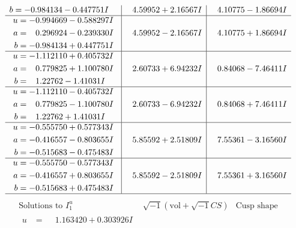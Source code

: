 \documentclass[1p]{elsarticle_modified}
\theoremstyle{definition}
\newcommand{\I}{\sqrt{-1}}
\begin{document}
$$\begin{array}{c|c|c}
\begin{aligned}
b &= -0.984134 - 0.447751 I\end{aligned}
 & \phantom{-}4.59952 + 2.16567 I & \phantom{-}4.10775 - 1.86694 I \\ \hline\begin{aligned}
u &= -0.994669 - 0.588297 I \\
a &= \phantom{-}0.296924 - 0.239330 I \\
b &= -0.984134 + 0.447751 I\end{aligned}
 & \phantom{-}4.59952 - 2.16567 I & \phantom{-}4.10775 + 1.86694 I \\ \hline\begin{aligned}
u &= -1.112110 + 0.405732 I \\
a &= \phantom{-}0.779825 + 1.100780 I \\
b &= \phantom{-}1.22762 - 1.41031 I\end{aligned}
 & \phantom{-}2.60733 + 6.94232 I & \phantom{-}0.84068 - 7.46411 I \\ \hline\begin{aligned}
u &= -1.112110 - 0.405732 I \\
a &= \phantom{-}0.779825 - 1.100780 I \\
b &= \phantom{-}1.22762 + 1.41031 I\end{aligned}
 & \phantom{-}2.60733 - 6.94232 I & \phantom{-}0.84068 + 7.46411 I \\ \hline\begin{aligned}
u &= -0.555750 + 0.577343 I \\
a &= -0.416557 - 0.803655 I \\
b &= -0.515683 - 0.475483 I\end{aligned}
 & \phantom{-}5.85592 + 2.51809 I & \phantom{-}7.55361 - 3.16560 I \\ \hline\begin{aligned}
u &= -0.555750 - 0.577343 I \\
a &= -0.416557 + 0.803655 I \\
b &= -0.515683 + 0.475483 I\end{aligned}
 & \phantom{-}5.85592 - 2.51809 I & \phantom{-}7.55361 + 3.16560 I\\
 \hline 
 \end{array}$$\newpage$$\begin{array}{c|c|c}  
\text{Solutions to }I^u_{1}& \I (\text{vol} + \sqrt{-1}CS) & \text{Cusp shape}\\
 \hline 
\begin{aligned}
u &= \phantom{-}1.163420 + 0.303926 I \\

\end{aligned}
\end{array}$$
\end{document}
